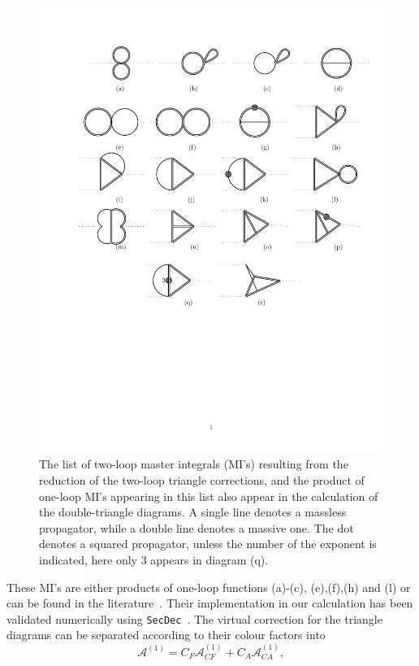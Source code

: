 \begin{figure}[htpb!]
	\begin{center}
		\includegraphics[width=12cm]{./figures/MI}
		\caption{ The list of two-loop  master integrals (MI's) resulting from the reduction of the two-loop triangle corrections, and the product of one-loop MI's appearing in this list also appear in the calculation of the double-triangle diagrams. A single line denotes a massless propagator, while a double line denotes a massive one. The dot denotes a squared propagator, unless the number of the exponent is indicated, here only $3$ appears in diagram (q). }
		\label{fig:trimis}
	\end{center}
\end{figure}
These MI's  are either products of one-loop functions (a)-(c), (e),(f),(h) and (l) or can be found in the literature~\cite{Bonciani:2003hc,Aglietti:2006tp}. Their implementation in our calculation has been validated numerically using \texttt{SecDec}~\cite{Borowka:2013cma,Borowka:2015mxa}.  
The virtual correction for the triangle diagrams can be separated according to their colour factors into
\begin{equation}
	\mathcal A ^{(1)}   = C_F \mathcal A_{CF} ^{(1)}  + C_A \mathcal A_{CA} ^{(1)},
\end{equation}
